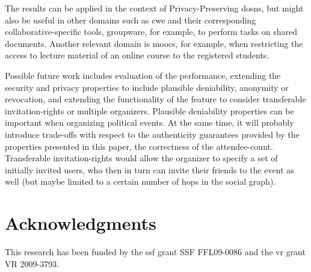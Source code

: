 The results can be applied in the context of Privacy-Preserving \acsp{dosn}, but 
might also be useful in other domains such as \Acl{cwe} and their corresponding collaborative-specific 
tools, \ie groupware, for example, to perform tasks on shared documents. Another 
relevant domain is \Aclp{mooc}, for example, when restricting the access to lecture 
material of an online course to the registered students.

Possible future work includes evaluation of the performance, extending the
security and privacy properties to include plausible
deniability, anonymity or revocation, and extending the functionality of
the feature to consider transferable invitation-rights or multiple
organizers.
%
Plausible deniability properties can be important when 
organizing political events. At the same time, it
will probably introduce trade-offs with respect to the authenticity
guarantees provided by the properties presented in this paper, \eg the
correctness of the attendee-count.
%
Transferable invitation-rights would allow the organizer to specify a
set of initially invited users, who then in turn can invite their
friends to the event as well (but maybe limited to a certain number of
hops in the social graph). 

\section*{Acknowledgments}
	\label{section:event-invitations-dosns:acknowledgments}
This research has 
been funded by the \Acl{ssf} grant SSF FFL09-0086 and the \Acl{vr} grant VR 2009-3793.


% 
% 
%
% 